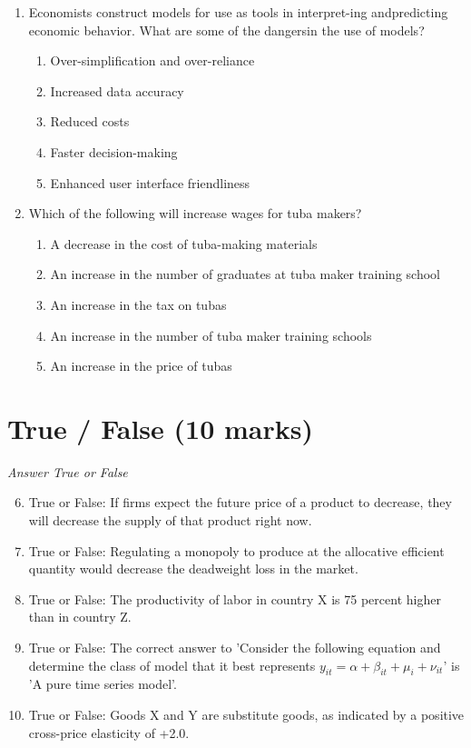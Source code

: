 \documentclass[12pt]{article}
\begin{document}
\begin{enumerate}[label=\arabic*.]
\begin{enumerate}[label=(\alph*)]
\end{enumerate}
\item Economists construct models for use as tools in interpret-ing andpredicting economic
behavior. What are some of the dangersin the use of models?
\begin{enumerate}[label=(\alph*)]
    \item Over-simplification and over-reliance
    \item Increased data accuracy
    \item Reduced costs
    \item Faster decision-making
    \item Enhanced user interface friendliness
\end{enumerate}
\item Which of the following will increase wages for tuba makers?
\begin{enumerate}[label=(\alph*)]
    \item A decrease in the cost of tuba-making materials
    \item An increase in the number of graduates at tuba maker training school
    \item An increase in the tax on tubas
    \item An increase in the number of tuba maker training schools
    \item An increase in the price of tubas
\end{enumerate}
\end{enumerate}

\section*{True / False (10 marks)}
\textit{Answer True or False}
\begin{enumerate}[label=\arabic*.]
\setcounter{enumi}{5}
\item True or False: If firms expect the future price of a product to decrease, they will decrease the supply of that product right now.
\item True or False: Regulating a monopoly to produce at the allocative efficient quantity would decrease the deadweight loss in the market.
\item True or False: The productivity of labor in country X is 75 percent higher than in country Z.
\item True or False: The correct answer to 'Consider the following equation and determine the class of model that it best represents $y_{it} = \alpha + \beta_{it} + \mu_i + \nu_{it}$' is 'A pure time series model'.
\item True or False: Goods X and Y are substitute goods, as indicated by a positive cross-price elasticity of +2.0.
\end{enumerate}
\end{document}
